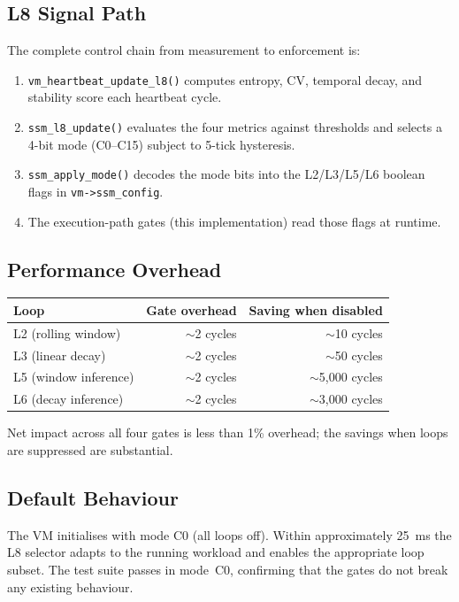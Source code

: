 \subsection{L8 Signal Path}

The complete control chain from measurement to enforcement is:

\begin{enumerate}
  \item \texttt{vm\_heartbeat\_update\_l8()} computes entropy, CV, temporal
        decay, and stability score each heartbeat cycle.
  \item \texttt{ssm\_l8\_update()} evaluates the four metrics against thresholds
        and selects a 4-bit mode (C0--C15) subject to 5-tick hysteresis.
  \item \texttt{ssm\_apply\_mode()} decodes the mode bits into the L2/L3/L5/L6
        boolean flags in \texttt{vm->ssm\_config}.
  \item The execution-path gates (this implementation) read those flags at
        runtime.
\end{enumerate}

\subsection{Performance Overhead}

\begin{center}
\begin{tabular}{lrr}
\toprule
Loop & Gate overhead & Saving when disabled \\
\midrule
L2 (rolling window) & $\sim$2 cycles & $\sim$10 cycles \\
L3 (linear decay)   & $\sim$2 cycles & $\sim$50 cycles \\
L5 (window inference) & $\sim$2 cycles & $\sim$5{,}000 cycles \\
L6 (decay inference)  & $\sim$2 cycles & $\sim$3{,}000 cycles \\
\bottomrule
\end{tabular}
\end{center}

Net impact across all four gates is less than 1\% overhead; the savings when
loops are suppressed are substantial.

\subsection{Default Behaviour}

The VM initialises with mode C0 (all loops off). Within approximately 25~ms the
L8 selector adapts to the running workload and enables the appropriate loop
subset. The test suite passes in mode~C0, confirming that the gates do not break
any existing behaviour.
